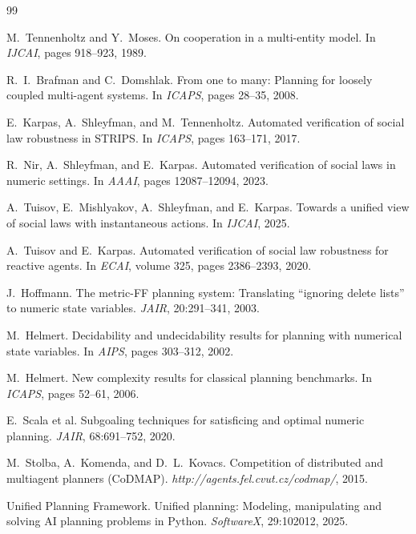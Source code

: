 \documentclass{article}
\theoremstyle{definition}
\begin{document}

\begin{thebibliography}{99}

M.\ Tennenholtz and Y.\ Moses.
On cooperation in a multi-entity model.
In \emph{IJCAI}, pages 918--923, 1989.

R.\ I.\ Brafman and C.\ Domshlak.
From one to many: Planning for loosely coupled multi-agent systems.
In \emph{ICAPS}, pages 28--35, 2008.

E.\ Karpas, A.\ Shleyfman, and M.\ Tennenholtz.
Automated verification of social law robustness in STRIPS.
In \emph{ICAPS}, pages 163--171, 2017.

R.\ Nir, A.\ Shleyfman, and E.\ Karpas.
Automated verification of social laws in numeric settings.
In \emph{AAAI}, pages 12087--12094, 2023.

A.\ Tuisov, E.\ Mishlyakov, A.\ Shleyfman, and E.\ Karpas.
Towards a unified view of social laws with instantaneous actions.
In \emph{IJCAI}, 2025.

A.\ Tuisov and E.\ Karpas.
Automated verification of social law robustness for reactive agents.
In \emph{ECAI}, volume 325, pages 2386--2393, 2020.

J.\ Hoffmann.
The metric-FF planning system: Translating ``ignoring delete lists'' to numeric state variables.
\emph{JAIR}, 20:291--341, 2003.

M.\ Helmert.
Decidability and undecidability results for planning with numerical state variables.
In \emph{AIPS}, pages 303--312, 2002.

M.\ Helmert.
New complexity results for classical planning benchmarks.
In \emph{ICAPS}, pages 52--61, 2006.

E.\ Scala et al.
Subgoaling techniques for satisficing and optimal numeric planning.
\emph{JAIR}, 68:691--752, 2020.

M.\ Stolba, A.\ Komenda, and D.\ L.\ Kovacs.
Competition of distributed and multiagent planners (CoDMAP).
\emph{http://agents.fel.cvut.cz/codmap/}, 2015.

Unified Planning Framework.
Unified planning: Modeling, manipulating and solving AI planning problems in Python.
\emph{SoftwareX}, 29:102012, 2025.

\end{thebibliography}
\end{document}
